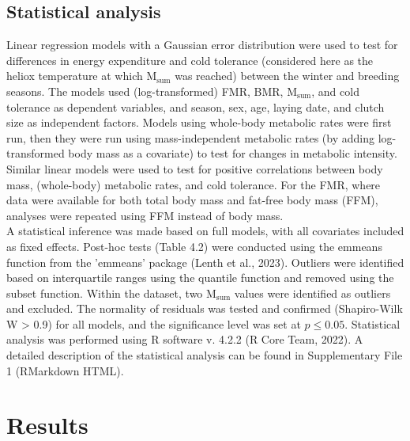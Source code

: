 \documentclass[10pt, twoside]{book} %
\begin{document}
\subsection{Statistical analysis}
Linear regression models with a Gaussian error distribution were used to test for differences in energy expenditure and cold tolerance (considered here as the heliox temperature at which M$_{\text{sum}}$ was reached) between the winter and breeding seasons. The models used (log-transformed) FMR, BMR, M$_{\text{sum}}$, and cold tolerance as dependent variables, and season, sex, age, laying date, and clutch size as independent factors. Models using whole-body metabolic rates were first run, then they were run using mass-independent metabolic rates (by adding log-transformed body mass as a covariate) to test for changes in metabolic intensity. Similar linear models were used to test for positive correlations between body mass, (whole-body) metabolic rates, and cold tolerance. For the FMR, where data were available for both total body mass and fat-free body mass (FFM), analyses were repeated using FFM instead of body mass.\\

A statistical inference was made based on full models, with all covariates included as fixed effects. Post-hoc tests (Table 4.2) were conducted using the emmeans function from the 'emmeans' package (Lenth et al., 2023). Outliers were identified based on interquartile ranges using the quantile function and removed using the subset function. Within the dataset, two M$_{\text{sum}}$ values were identified as outliers and excluded. The normality of residuals was tested and confirmed (Shapiro-Wilk W > 0.9) for all models, and the significance level was set at $p \leq 0.05$. Statistical analysis was performed using R software v. 4.2.2 (R Core Team, 2022). A detailed description of the statistical analysis can be found in Supplementary File 1 (RMarkdown HTML).
\clearpage

\section{Results}
\end{document}
